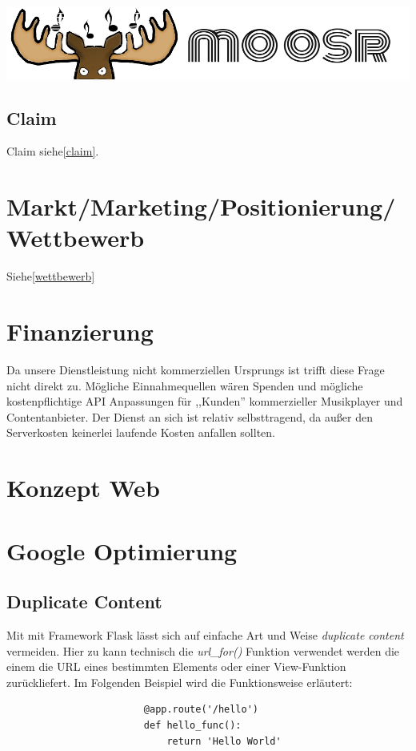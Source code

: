 \documentclass[11pt]{scrreprt}
\begin{document}
\begin{center}
    \includegraphics[scale=0.4]{./elchlogo.png}
\end{center}
\section{Claim}
Claim siehe\ref{claim}.


\chapter{Markt/Marketing/Positionierung/Wettbewerb}
Siehe\ref{wettbewerb}


\chapter{Finanzierung}
Da unsere Dienstleistung nicht kommerziellen Ursprungs ist trifft diese Frage
nicht direkt zu. Mögliche Einnahmequellen wären Spenden und mögliche kostenpflichtige API
Anpassungen für ,,Kunden'' kommerzieller Musikplayer und Contentanbieter.
Der Dienst an sich ist relativ selbsttragend, da außer den Serverkosten
keinerlei laufende Kosten anfallen sollten.


\chapter{Konzept Web}


\chapter{Google Optimierung}
\section{Duplicate Content}
Mit mit Framework Flask lässt sich auf einfache Art und Weise \emph{duplicate
content} vermeiden. Hier zu kann technisch die \emph{url\_for()} Funktion
verwendet werden die einem die URL eines bestimmten Elements oder einer
View-Funktion zurückliefert. Im Folgenden Beispiel wird die Funktionsweise
erläutert:
\begin{verbatim}
                        @app.route('/hello')
                        def hello_func():
                            return 'Hello World'
\end{verbatim}
\end{document}
